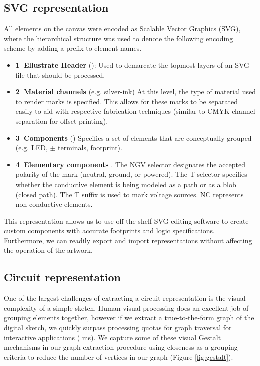 \documentclass{sigchi}
\begin{document}
    \subsection{SVG representation}
    All elements on the canvas were encoded as Scalable Vector Graphics (SVG), where the hierarchical structure was used to denote the following encoding scheme by adding a prefix to element names.
    \begin{itemize}
        \item \textbf{1\degree~Ellustrate Header} (): Used to demarcate the topmost layers of an SVG file that should be processed.
        \item \textbf{2\degree~Material channels} (e.g.  silver-ink) At this level, the type of material used to render marks is specified. This allows for these marks to be separated easily to aid with respective fabrication techniques (similar to CMYK channel separation for offset printing).
        \item \textbf{3\degree~Components} () Specifies a set of elements that are conceptually grouped (e.g. LED, $\pm$ terminals, footprint).
        \item \textbf{4\degree~Elementary components} .
        The N\textbar G\textbar V selector designates the accepted polarity of the mark (neutral, ground, or powered). The T selector specifies whether the conductive element is being modeled as a path or as a blob (closed path). The T suffix is used to mark voltage sources. NC represents non-conductive elements.
    \end{itemize}

    This representation allows us to use off-the-shelf SVG editing software to create custom components with accurate footprints and logic specifications. Furthermore, we can readily export and import representations without affecting the operation of the artwork.

    \subsection{Circuit representation}
      One of the largest challenges of extracting a circuit representation is the visual complexity of a simple sketch. Human visual-processing does an excellent job of grouping elements together, however if we extract a true-to-the-form graph of the digital sketch, we quickly surpass processing quotas for graph traversal for interactive applications ( ms). We capture some of these visual Gestalt mechanisms in our graph extraction procedure using closeness as a grouping criteria to reduce the number of vertices in our graph (Figure \ref{fig:gestalt}). 
\end{document}
